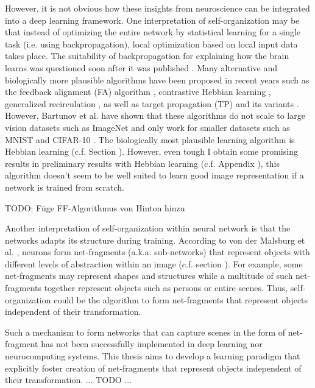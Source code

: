 However, it is not obvious how these insights from neuroscience can be integrated into a deep learning framework.
One interpretation of self-organization may be that instead of optimizing the entire network by statistical learning for a single task (i.e. using backpropagation), local optimization based on local input data takes place.
The suitability of backpropagation for explaining how the brain learns was questioned soon after it was published .
Many alternative and biologically more plausible algorithms have been proposed in recent years such as the feedback alignment (FA) algorithm , contrastive Hebbian learning , generalized recirculation , as well as target propagation (TP) and its variants .
However, Bartunov et al.  have shown that these algorithms do not scale to large vision datasets such as ImageNet \cite{deng2009imagenet} and only work for smaller datasets such as MNIST \cite{MNIST} and CIFAR-10 \cite{cifar_10}.
The biologically most plausible learning algorithm is Hebbian learning (c.f. Section ).
However, even tough I obtain some promising results in preliminary results with Hebbian learning (c.f. Appendix ), this algorithm doesn't seem to be well suited to learn good image representation if a network is trained from scratch.

TODO: Füge FF-Algorithmus von Hinton hinzu

Another interpretation of self-organization within neural network is that the networks adapts its structure during training.
According to von der Malsburg et al. \cite{von_der_Malsburg_Stadelmann_Grewe_2022}, neurons form net-fragments (a.k.a. sub-networks) that represent objects with different levels of abstraction within an image (c.f. section ).
For example, some net-fragments may represent shapes and structures while a multitude of such net-fragments together represent objects such as persons or entire scenes.
Thus, self-organization could be the algorithm to form net-fragments that represent objects independent of their transformation.

Such a mechanism to form networks that can capture scenes in the form of net-fragment has not been successfully implemented in deep learning nor neurocomputing systems.
This thesis aims to develop a learning paradigm that explicitly foster creation of net-fragments that represent objects independent of their transformation.
... TODO ...




